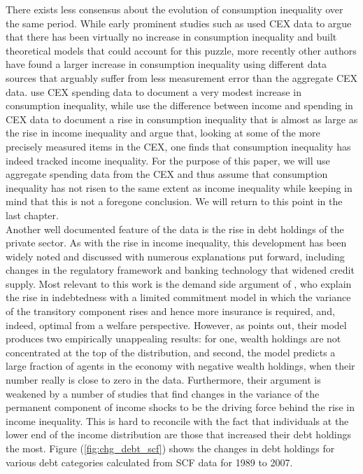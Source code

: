 There exists less consensus about the evolution of consumption inequality over 
the same period. While early prominent studies such as \citet{KruegerPerri2006}
 used CEX data to argue that there has been virtually no increase in consumption 
inequality and built theoretical models that could account for this puzzle, more 
recently other authors have found a larger increase in consumption inequality 
using different data sources that arguably suffer from less measurement error than
the aggregate CEX data. \citet{HeathcotePerriViolante2010} use CEX spending data
 to document a very modest increase in consumption inequality, while 
\citet{AguiarBils2015} use the difference between income and spending in CEX data
 to document a rise in consumption inequality that is almost as large as the rise
 in income inequality and \citet{AHP2013} argue that, looking at some of the more
precisely measured items in the CEX, one finds that consumption inequality has 
indeed tracked income inequality. For the purpose of this paper, we will use 
aggregate spending data from the CEX and thus assume that consumption inequality 
has not risen to the same extent as income inequality while keeping in mind that 
this is not a foregone conclusion. We will return to this point in the last chapter. \\
Another well documented feature of the data is the rise in debt holdings of the 
private sector. As with the rise in income inequality, this development has been 
widely noted and discussed with numerous explanations put forward, including 
changes in the regulatory framework and banking technology that widened credit 
supply. Most relevant to this work is the demand side argument of \citet{KruegerPerri2006}, 
who explain the rise in indebtedness with a limited commitment model in which the
 variance of the transitory component rises and hence more insurance is required,
 and, indeed, optimal from a welfare perspective. However, as \citet{Cordoba2008}
 points out, their model produces two empirically unappealing results: for one, 
wealth holdings are not concentrated at the top of the distribution, and second, 
the model predicts a large fraction of agents in the economy with negative wealth 
holdings, when their number really is close to zero in the data. Furthermore,
 their argument is weakened by a number of studies that find changes in the 
variance of the permanent component of income shocks to be the driving force 
behind the rise in income inequality. This is hard to reconcile with the fact 
that individuals at the lower end of the income distribution are those that 
increased their debt holdings the most. Figure (\ref{fig:chg_debt_scf}) shows 
the changes in debt holdings for various debt categories calculated from SCF 
data for 1989 to 2007. 

